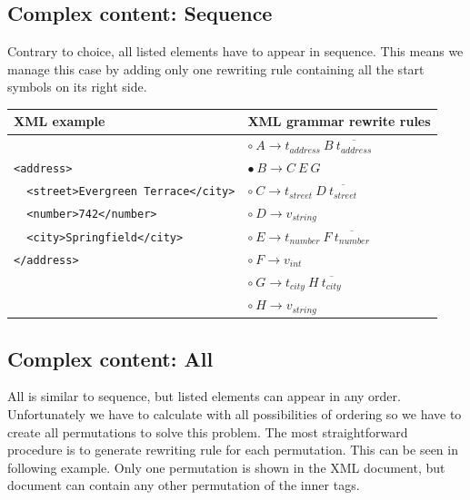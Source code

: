 \documentclass[12pt,notitlepage]{report}
\begin{document}
\subsection{Complex content: Sequence}

Contrary to choice, all listed elements have to appear in sequence. This means we manage this case by adding only one rewriting rule containing all the start symbols on its right side.

\begin{center}
\setlength{\tabcolsep}{0.5cm}
\renewcommand{\arraystretch}{1.3}
\begin{tabular}{|l|l|}
\hline
XML example & XML grammar rewrite rules \\ \hline
 & $\circ~A \rightarrow t_{address}~B~\overline{t_{address}}$ \\
\texttt{<address>} & $\bullet~B \rightarrow C~E~G$ \\
\texttt{~~<street>Evergreen Terrace</city>} & $\circ~C \rightarrow t_{street}~D~\overline{t_{street}}$ \\
\texttt{~~<number>742</number>} & $\circ~D \rightarrow v_{string}$ \\
\texttt{~~<city>Springfield</city>} & $\circ~E \rightarrow t_{number}~F~\overline{t_{number}}$ \\
\texttt{</address>} & $\circ~F \rightarrow v_{int}$ \\
 & $\circ~G \rightarrow t_{city}~H~\overline{t_{city}}$ \\
 & $\circ~H \rightarrow v_{string}$ \\ \hline
\end{tabular}
\end{center}

\subsection{Complex content: All}
All is similar to sequence, but listed elements can appear in any order. Unfortunately we have to calculate with all possibilities of ordering so we have to create all permutations to solve this problem. The most straightforward procedure is to generate rewriting rule for each permutation. This can be seen in following example. Only one permutation is shown in the XML document, but document can contain any other permutation of the inner tags.
\end{document}
